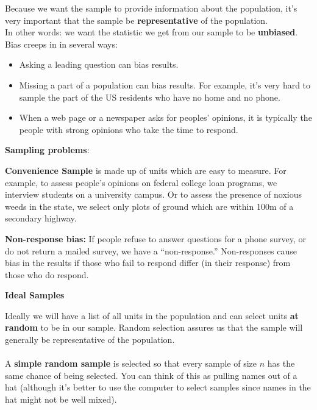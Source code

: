 Because we want the sample to provide information about the
population, it's very important that the sample be {\bf
  representative} of the population. \\
In other words: we want the statistic we get from our sample to be
{\bf unbiased}.  Bias creeps in in several ways:
\begin{itemize}
  \item Asking a leading question can bias results.  
  \item Missing a part of a population can bias results.  For example,
    it's very hard to sample the part of the US residents who have
    no home and no phone.
  \item When a web page or a newspaper asks for peoples' opinions, it
    is typically the people with strong opinions who take the time
    to respond. 
\end{itemize}

\begin{center}
  {\bf Sampling problems}:\vspace{-.5cm}
\end{center}
\begin{list}{}{}
\item [\bf Convenience Sample]  is made up of units which are easy to
  measure. For example, to assess people's opinions on federal college
  loan programs, we interview students on a university campus.  Or to
  assess the presence of noxious weeds in the state, we select only plots
  of ground which are within 100m of a secondary highway. 
\item [\bf Non-response bias:] If people refuse to answer questions
  for a phone survey, or do not return a mailed survey, we have a
  ``non-response.'' Non-responses cause bias in the results if those
  who fail to respond differ (in their response) from those who do
  respond. 
\end{list}

\begin{center}
  {\bf Ideal Samples}
\end{center}
 Ideally we will have a list of all units in the population and can
 select units {\bf at random} to be in our sample. 
Random selection assures us that the sample will generally be
representative of the population.\\ \\
 A {\bf simple random sample} is selected so that every sample of size
 $n$ has the same chance of being selected.  You can think of this as
 pulling names out of a hat (although it's better to use the computer
 to select samples since names in the hat might not be well mixed). 

